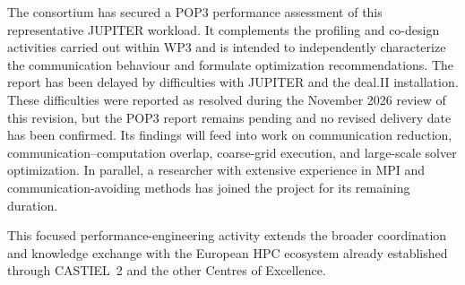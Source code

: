 \documentclass[a4paper,12pt]{article}
\begin{document}
The consortium has secured a POP3 performance assessment of this
representative JUPITER workload. It complements the profiling and co-design
activities carried out within WP3 and is intended to independently
characterize the communication behaviour and formulate optimization
recommendations. The report has been delayed by difficulties with JUPITER
and the deal.II installation. These difficulties were reported as
resolved during the November 2026 review of this revision, but the POP3
report remains pending and no revised delivery date has been confirmed.
Its findings will feed into work on communication
reduction, communication--computation overlap, coarse-grid execution, and
large-scale solver optimization. In parallel, a researcher with extensive
experience in MPI and communication-avoiding methods has joined the project
for its remaining duration.

This focused performance-engineering activity extends the broader
coordination and knowledge exchange with the European HPC ecosystem already
established through CASTIEL~2 and the other Centres of Excellence.


%

    
\label{MyLastPage}
\end{document}

